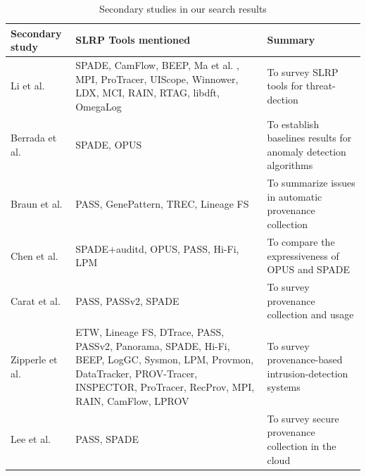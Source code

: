 \begin{table}
\caption{Secondary studies in our search results}
\label{table:secondary-studies}
\renewcommand{\arraystretch}{1.4}
\begin{tabular}{p{}p{}p{}}
Secondary study                             & SLRP Tools mentioned                              & Summary                                                         \\
\midrule
Li et al. \cite{li_threat_2021}             & SPADE, CamFlow, BEEP,
                                              Ma et al. \cite{ma_accurate_2015}, MPI, ProTracer,
                                              UIScope, Winnower, LDX, MCI, RAIN, RTAG, libdft,
                                              OmegaLog                                          & To survey SLRP tools for threat-dection                         \\
Berrada et al. \cite{berrada_baseline_2020} & SPADE, OPUS                                       & To establish baselines results for anomaly detection algorithms \\
Braun et al. \cite{hutchison_issues_2006}   & PASS, GenePattern, TREC, Lineage FS               & To summarize issues in automatic provenance collection          \\
Chen et al. \cite{chan_expressiveness_2017} & SPADE+auditd, OPUS, PASS, Hi-Fi, LPM              & To compare the expressiveness of OPUS and SPADE                 \\
Carat et al. \cite{carata_primer_2014}      & PASS, PASSv2, SPADE                               & To survey provenance collection and usage                       \\
Zipperle et al.
\cite{zipperle_provenance-based_2022}       & ETW, Lineage FS, DTrace, PASS, PASSv2, Panorama,
                                              SPADE, Hi-Fi, BEEP, LogGC, Sysmon, LPM, Provmon,
                                              DataTracker, PROV-Tracer, INSPECTOR, ProTracer,
                                              RecProv, MPI, RAIN, CamFlow, LPROV                & To survey provenance-based intrusion-detection systems          \\
Lee et al. \cite{lee_towards_2015}          & PASS, SPADE                                       & To survey secure provenance collection in the cloud             \\
\end{tabular}
\end{table}


